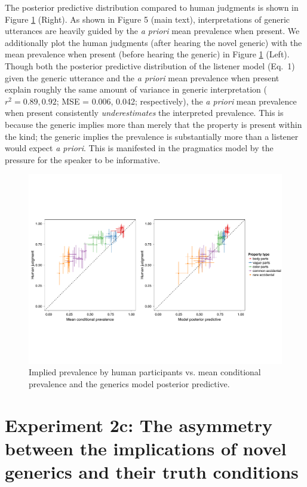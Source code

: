 \documentclass[10pt,letterpaper]{article}
\begin{document}
The posterior predictive distribution compared to human judgments is shown in Figure \ref{fig:byItemScatter} (Right). 
As shown in Figure 5 (main text), interpretations of generic utterances are heavily guided by the \emph{a priori} mean prevalence when present. 
We additionally plot the human judgments (after hearing the novel generic) with the mean prevalence when present (before hearing the generic) in Figure \ref{fig:byItemScatter} (Left). 
Though both the posterior predictive distribution of the listener model (Eq.~1) given the generic utterance and the \emph{a priori} mean prevalence when present explain roughly the same amount of variance in generic interpretation ($r^2 = 0.89, 0.92$; MSE = 0.006, 0.042;   respectively), the \emph{a priori} mean prevalence when present consistently \emph{underestimates} the interpreted prevalence.
This is because the generic implies more than merely that the property is present within the kind; the generic implies the prevalence is substantially more than a listener would expect \emph{a priori}. 
This is manifested in the pragmatics model by the pressure for the speaker to be informative. 

\begin{figure}
\centering
    \includegraphics[width=\columnwidth]{implied-byItem-mcp-pp}
    \caption{Implied prevalence by human participants vs. mean conditional prevalence and the generics model posterior predictive.}
  \label{fig:byItemScatter}
\end{figure}


\section{Experiment 2c: The asymmetry between the implications of novel generics and their truth conditions}
\end{document}
